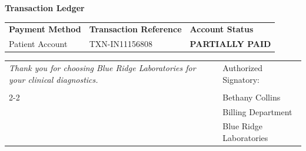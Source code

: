 \documentclass[10pt,letterpaper]{article}
\begin{document}
\vspace{1em}

{\fontsize{12pt}{14pt}\selectfont\bfseries\color{brandsecondary} Transaction Ledger}
\vspace{0.5em}
\begin{tabularx}{\textwidth}{@{}X X X@{}}
    {\bfseries Payment Method} & {\bfseries Transaction Reference} & {\bfseries Account Status} \\
    Patient Account & TXN-IN11156808 & {\bfseries\color{brandprimary} PARTIALLY PAID} \\
\end{tabularx}

\vspace{4em}

\begin{tabularx}{\textwidth}{@{}X l@{}}
    \textit{Thank you for choosing Blue Ridge Laboratories for your clinical diagnostics.} & Authorized Signatory:\\
    & \\ \cline{2-2}
    & Bethany Collins \\
    & Billing Department \\
    & Blue Ridge Laboratories \\
\end{tabularx}
\end{document}
